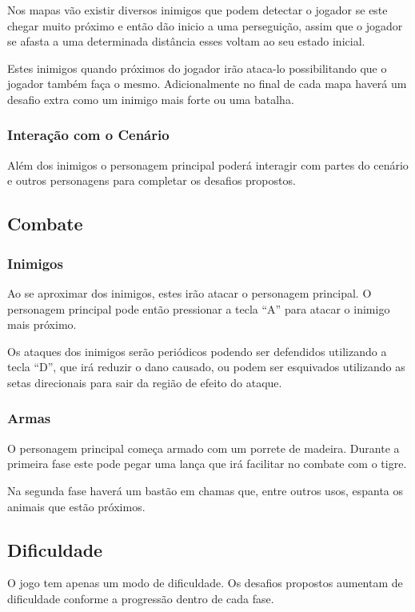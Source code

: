 Nos mapas vão existir diversos inimigos que podem detectar o jogador se 
este chegar muito próximo 
e então dão inicio a uma perseguição, assim que o jogador se afasta a 
uma determinada distância esses voltam ao seu estado inicial. 

Estes inimigos quando próximos do jogador irão ataca-lo possibilitando que o 
jogador também faça o mesmo. 
Adicionalmente no final de cada mapa haverá um desafio extra como um inimigo
 mais forte ou uma batalha.  

\subsubsection {Interação com o Cenário}

Além dos inimigos o personagem principal poderá interagir com partes do
 cenário e outros personagens para completar os
desafios propostos.

\subsection {Combate}
\subsubsection{Inimigos}
Ao se aproximar dos inimigos, estes irão atacar o personagem principal. O
 personagem principal pode então pressionar a tecla ``A'' para atacar o
 inimigo mais próximo.

Os ataques dos inimigos serão periódicos podendo ser defendidos utilizando a
 tecla ``D'', que irá reduzir o dano causado, ou podem ser esquivados
 utilizando as 
setas direcionais para sair da região de efeito do ataque.

\subsubsection {Armas}
O personagem principal começa armado com um porrete de madeira. Durante a
 primeira fase este pode pegar uma lança que irá facilitar no combate com o
 tigre. 

Na segunda fase haverá um bastão em chamas que, entre outros usos, espanta
 os animais que estão próximos.

\subsection {Dificuldade}

O jogo tem apenas um modo de dificuldade. Os desafios propostos aumentam de
 dificuldade conforme a progressão dentro de cada fase.

